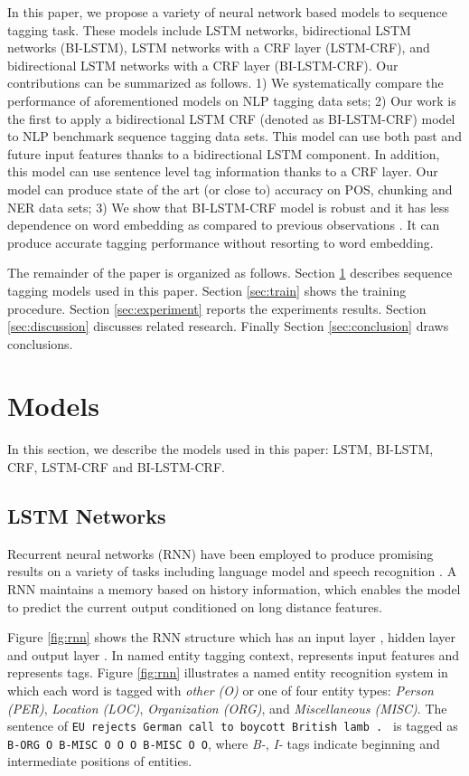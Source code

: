\documentclass[11pt,a4paper]{article}
\begin{document}
In this paper, we propose a variety of neural network based models to sequence tagging task. These models include LSTM networks, bidirectional LSTM networks (BI-LSTM), LSTM networks with a CRF layer (LSTM-CRF), and bidirectional LSTM networks with a CRF layer (BI-LSTM-CRF). Our contributions can be summarized as follows. 1) We systematically compare the performance of aforementioned models on NLP tagging data sets; 2) Our work is the first to apply a bidirectional LSTM CRF (denoted as BI-LSTM-CRF) model to NLP benchmark sequence tagging data sets. This model can use both past and future input features thanks to a bidirectional LSTM component. In addition, this model can use sentence level tag information thanks to a CRF layer. Our model can produce state of the art (or close to) accuracy on POS, chunking and NER data sets; 3) We show that BI-LSTM-CRF model is robust and it has less dependence on word embedding as compared to previous observations \cite{collobert1}. It can produce accurate tagging performance without resorting to word embedding. 

The remainder of the paper is organized as follows. Section \ref{sec:model} describes sequence tagging models used in this paper. Section \ref{sec:train} shows the training procedure. Section \ref{sec:experiment} reports the experiments results. Section \ref{sec:discussion} discusses related research. Finally Section \ref{sec:conclusion} draws conclusions.


\section{Models} \label{sec:model}
In this section, we describe the models used in this paper: LSTM, BI-LSTM, CRF, LSTM-CRF and BI-LSTM-CRF.  

\subsection{LSTM Networks}
Recurrent neural networks (RNN) have been employed to produce promising results on a variety of tasks including language model \cite{mikolov1,mikolov2} and speech recognition \cite{graves1}.  A RNN maintains a memory based on history information, which enables the model to predict the current output conditioned on long distance features. 

Figure \ref{fig:rnn} shows the RNN structure \cite{elman1} which has an input layer , hidden layer  and output layer . In named entity tagging context,  represents input features and  represents tags. Figure \ref{fig:rnn} illustrates a named entity recognition system in which each word is tagged with \textit{other (O)} or one of four entity types: \textit{Person (PER)}, \textit{Location (LOC)}, \textit{Organization (ORG)}, and \textit{Miscellaneous (MISC)}.  The sentence of \texttt{EU rejects German call to boycott British lamb . } is tagged as \texttt{B-ORG O B-MISC O O O B-MISC O O}, where \textit{B-}, \textit{I-} tags indicate beginning and intermediate positions of entities. 
\end{document}
